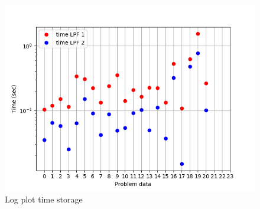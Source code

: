 \documentclass[a4paper,10 pt,titlepage,twoside]{book}
\theoremstyle{plain}
\theoremstyle{definition}
\theoremstyle{remark}
\begin{document}
\begin{figure}
\begin{center}
\includegraphics[width=9 cm]{timeLPF12}\caption{Log plot time storage} \label{fig:float}
\end{center}
\end{figure}
\newpage
\end{document}

